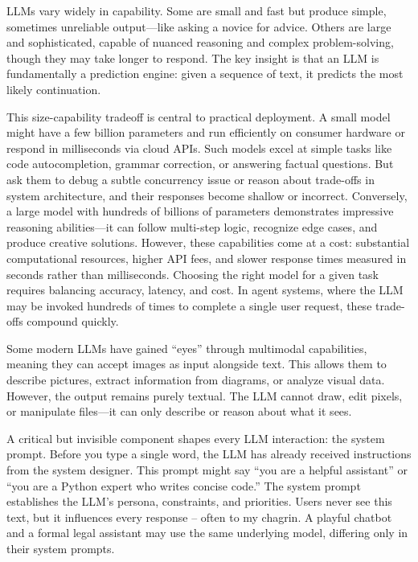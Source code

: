 LLMs vary widely in capability. Some are small and fast but produce simple, sometimes unreliable output---like asking a novice for advice. Others are large and sophisticated, capable of nuanced reasoning and complex problem-solving, though they may take longer to respond. The key insight is that an LLM is fundamentally a prediction engine: given a sequence of text, it predicts the most likely continuation.

This size-capability tradeoff is central to practical deployment. A small model might have a few billion parameters and run efficiently on consumer hardware or respond in milliseconds via cloud APIs. Such models excel at simple tasks like code autocompletion, grammar correction, or answering factual questions. But ask them to debug a subtle concurrency issue or reason about trade-offs in system architecture, and their responses become shallow or incorrect. Conversely, a large model with hundreds of billions of parameters demonstrates impressive reasoning abilities---it can follow multi-step logic, recognize edge cases, and produce creative solutions. However, these capabilities come at a cost: substantial computational resources, higher API fees, and slower response times measured in seconds rather than milliseconds. Choosing the right model for a given task requires balancing accuracy, latency, and cost. In agent systems, where the LLM may be invoked hundreds of times to complete a single user request, these trade-offs compound quickly.

Some modern LLMs have gained ``eyes'' through multimodal capabilities, meaning they can accept images as input alongside text. This allows them to describe pictures, extract information from diagrams, or analyze visual data. However, the output remains purely textual. The LLM cannot draw, edit pixels, or manipulate files---it can only describe or reason about what it sees.

A critical but invisible component shapes every LLM interaction: the system prompt. Before you type a single word, the LLM has already received instructions from the system designer. This prompt might say ``you are a helpful assistant'' or ``you are a Python expert who writes concise code.'' The system prompt establishes the LLM's persona, constraints, and priorities. Users never see this text, but it influences every response -- often to my chagrin. A playful chatbot and a formal legal assistant may use the same underlying model, differing only in their system prompts.

